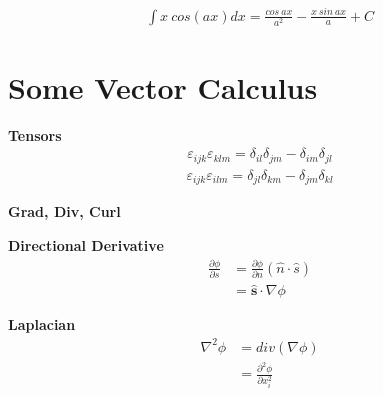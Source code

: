 \documentclass{article}
\begin{document}
\begin{align*}
    \int x \ cos(ax) dx = \frac{cos \ ax}{a^2} - \frac{x \ sin \ ax}{a}+ C
\end{align*}
\newline

\section{Some Vector Calculus}
\Large \textbf{Tensors}
\begin{align*}
    \varepsilon_{ijk} \varepsilon_{klm} = \delta_{il} \delta_{jm} - \delta_{im} \delta_{jl}
\end{align*}
\begin{align*}
    \varepsilon_{ijk} \varepsilon_{ilm} = \delta_{jl} \delta_{km} - \delta_{jm} \delta_{kl}
\end{align*}
\newline


\noindent
\Large{\textbf{Grad, Div, Curl}}
\newline

\textbf{Directional Derivative}
\begin{align*}
    \frac{\partial \phi}{\partial s} &= \frac{\partial \phi}{\partial n} (\hat{n} \cdot  \hat{s}) \\
                                     &= \mathbf{\hat{s}} \cdot \nabla \phi
\end{align*}

\textbf{Laplacian}
\begin{align*}
    \nabla^2 \phi &= div(\nabla \phi) \\
                  &= \frac{\partial^2 \phi }{\partial x_i^2}
\end{align*}
\end{document}

